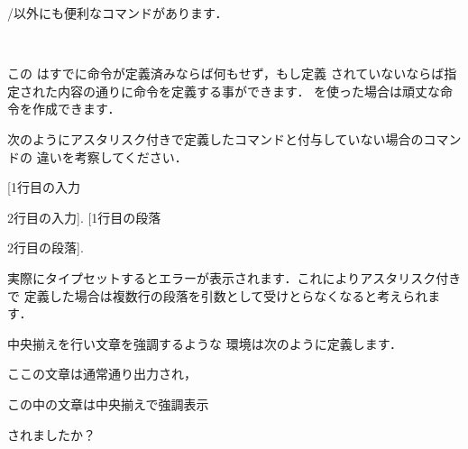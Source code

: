 /以外にも便利なコマンドがあります．

\begin{Syntax}
\\
\end{Syntax}

この はすでに命令が定義済みならば何もせず，もし定義
されていないならば指定された内容の通りに命令を定義する事ができます．
を使った場合は頑丈な命令を作成できます．

\begin{Prob}
次のようにアスタリスク付きで定義したコマンドと付与していない場合のコマンドの
違いを考察してください．

\begin{InTeX}
\newcommand\testargs[1]{[#1]}
\newcommand*\testArgs[1]{[#1]}
\testArgs{1行目の入力\par 2行目の入力}.
\testargs{1行目の段落\par 2行目の段落}.
\end{InTeX} 

実際にタイプセットするとエラーが表示されます．これによりアスタリスク付きで
定義した場合は複数行の段落を引数として受けとらなくなると考えられます．
\end{Prob}

\begin{Exe}
中央揃えを行い文章を強調するような  環境は次のように定義します．
\begin{InOut}
\newenvironment{cemph}%
  {\begin{center}\begin{em}}%
  {\end{em}\end{center}}
ここの文章は通常通り出力され，
\begin{cemph}
この中の文章は中央揃えで強調表示
\end{cemph}
されましたか？
\end{InOut}
\end{Exe}

